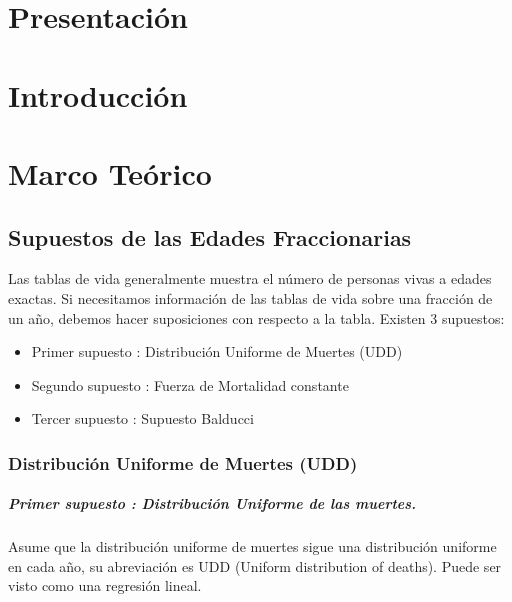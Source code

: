 \documentclass[12pt]{report}
\begin{document}


\tableofcontents  



\chapter{Presentaci\'on}

\chapter{Introducci\'on}

\chapter{Marco Te\'orico}

\section{Supuestos de las Edades Fraccionarias}
\setcounter{equation}{0}

Las tablas de vida generalmente muestra el n\'umero de personas vivas a edades exactas. Si necesitamos informaci\'on de las tablas de vida sobre una fracci\'on de un a\~no, debemos hacer suposiciones con respecto a la tabla. Existen 3 supuestos:

\begin{itemize}
\item Primer supuesto : Distribuci\'on Uniforme de Muertes (UDD)
\item Segundo supuesto : Fuerza de Mortalidad constante
\item Tercer supuesto : Supuesto Balducci
\end{itemize}


\subsection{Distribuci\'on Uniforme de Muertes (UDD)}

\paragraph{Primer supuesto : \textit{Distribuci\'on Uniforme de las muertes.}} \cite{UDD2015} Asume que la distribuci\'on uniforme de muertes sigue una distribuci\'on uniforme en cada a\~no, su abreviaci\'on es UDD (Uniform distribution of deaths). Puede ser visto como una regresi\'on lineal.
\end{document}
